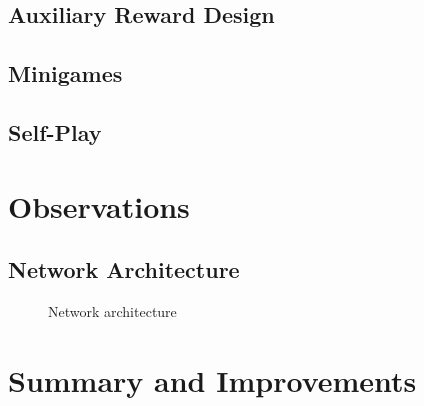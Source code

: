 \documentclass[12pt]{article}
\begin{document}
\subsection{Auxiliary Reward Design}

\subsection{Minigames} %

\subsection{Self-Play} %



\section{Observations}
\subsection{Network Architecture}


\begin{figure}
  \centering
  
  \caption{Network architecture}
\end{figure}


\section{Summary and Improvements}




\printbibliography
\end{document}
